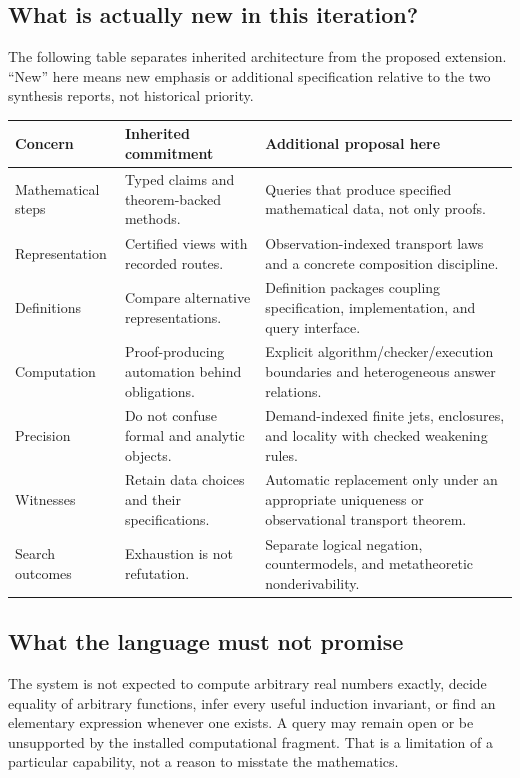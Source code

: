\documentclass[11pt,a4paper]{article}
\theoremstyle{definition}
\begin{document}
\subsection{What is actually new in this iteration?}
The following table separates inherited architecture from the proposed extension. ``New'' here means new emphasis or additional specification relative to the two synthesis reports, not historical priority.

\begin{tabularx}{\textwidth}{@{}P{.28\textwidth}YY@{}}
\toprule
Concern & Inherited commitment & Additional proposal here\\
\midrule
Mathematical steps & Typed claims and theorem-backed methods. & Queries that produce specified mathematical data, not only proofs.\\
Representation & Certified views with recorded routes. & Observation-indexed transport laws and a concrete composition discipline.\\
Definitions & Compare alternative representations. & Definition packages coupling specification, implementation, and query interface.\\
Computation & Proof-producing automation behind obligations. & Explicit algorithm/checker/execution boundaries and heterogeneous answer relations.\\
Precision & Do not confuse formal and analytic objects. & Demand-indexed finite jets, enclosures, and locality with checked weakening rules.\\
Witnesses & Retain data choices and their specifications. & Automatic replacement only under an appropriate uniqueness or observational transport theorem.\\
Search outcomes & Exhaustion is not refutation. & Separate logical negation, countermodels, and metatheoretic nonderivability.\\
\bottomrule
\end{tabularx}

\subsection{What the language must not promise}
The system is not expected to compute arbitrary real numbers exactly, decide equality of arbitrary functions, infer every useful induction invariant, or find an elementary expression whenever one exists. A query may remain open or be unsupported by the installed computational fragment. That is a limitation of a particular capability, not a reason to misstate the mathematics.
\end{document}
